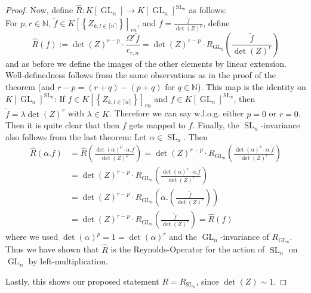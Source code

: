 \begin{proof}
  Now, define $\hat{R} \colon K \left\lbrack \operatorname{GL}_n \right\rbrack \longrightarrow K \left\lbrack \operatorname{GL}_n \right\rbrack ^{\operatorname{SL}_n} $ as follows: \\
  For $ p,r \in \mathbb{N} $, $ \tilde{f} \in K \left\lbrack \left\lbrace Z_{k,l \in \lceil n \rceil} \right\rbrace \right\rbrack_{rn} $, and $ f = \frac{\tilde{f}}{\operatorname{det} (Z)^p } $, define
  \begin{equation}
    \hat{R} (f) := \operatorname{det} (Z)^{r-p} \cdot \frac{ \Omega^r \tilde{f} }{ c_{r,n} }
    = \operatorname{det} (Z)^{r-p} \cdot R_{\operatorname{GL}_n} \left( \frac{\tilde{f}}{\operatorname{det} (Z) ^r} \right)
  \end{equation}
  and as before we define the images of the other elements by linear extension.
  Well-definedness follows from the same observations as in the proof of the theorem (and $ r-p = (r+q)-(p+q) $ for $ q \in \mathbb{N} $).
  This map is the identity on $ K \left\lbrack \operatorname{GL}_n \right\rbrack ^{\operatorname{SL}_n }$:
  If $ f \in K \left\lbrack \left\lbrace Z_{k,l \in \lceil n \rceil} \right\rbrace \right\rbrack_{rn} $ and $ f \in K \left\lbrack \operatorname{GL}_n \right\rbrack ^{\operatorname{SL}_n} $, then $ \tilde{f} = \lambda \operatorname{det} (Z)^r $ with $ \lambda \in K $.
  Therefore we can say w.l.o.g. either $p=0$ or $r=0$.
  Then it is quite clear that then $f$ gets mapped to $f$.
  Finally, the $\operatorname{SL}_n$-invariance also follows from the last theorem: Let $\alpha \in \operatorname{SL}_n$.
  Then
  \begin{equation}
    \begin{aligned}
      \hat{R} (\alpha . f)
      &= \hat{R} \left( \frac{ \operatorname{det} (\alpha)^p \cdot \alpha . \tilde{f} }{ \operatorname{det} (Z)^p } \right) 
      = \operatorname{det} (Z)^{r-p} \cdot R_{\operatorname{GL}_n} \left( \frac{ \operatorname{det} (\alpha)^p \cdot \alpha . \tilde{f} }{ \operatorname{det}(Z)^r } \right) \\
      &= \operatorname{det} (Z)^{r-p} \cdot R_{\operatorname{GL}_n} \left( \frac{ \operatorname{det} (\alpha)^r \cdot \alpha . \tilde{f} }{ \operatorname{det}(Z)^r } \right) \\
      &= \operatorname{det} (Z)^{r-p} \cdot R_{\operatorname{GL}_n} \left( \alpha . \left( \frac{ \tilde{f} }{ \operatorname{det} (Z)^r } \right) \right) \\
      &= \operatorname{det} (Z)^{r-p} \cdot R_{\operatorname{GL}_n} \left( \frac{ \tilde{f} }{ \operatorname{det} (Z)^r } \right)
      = \hat{R} (f)
    \end{aligned}
  \end{equation}
  where we used $ \operatorname{det} (\alpha)^p = 1 = \operatorname{det} (\alpha)^r $ and the $\operatorname{GL}_n$-invariance of $R_{\operatorname{GL}_n}$.
  Thus we have shown that $\hat{R}$ is the Reynolds-Operator for the action of $\operatorname{SL}_n$ on $\operatorname{GL}_n$ by left-multiplication.

  Lastly, this shows our proposed statement $ R = R_{\operatorname{SL}_n} $, since $ \operatorname{det} (Z) \sim 1 $.
\end{proof}

